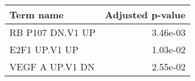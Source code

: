 \begin{tabular}{lr}
\toprule
       Term name &  Adjusted p-value \\
\midrule
RB P107 DN.V1 UP &          3.46e-03 \\
   E2F1 UP.V1 UP &          1.03e-02 \\
 VEGF A UP.V1 DN &          2.55e-02 \\
\bottomrule
\end{tabular}
